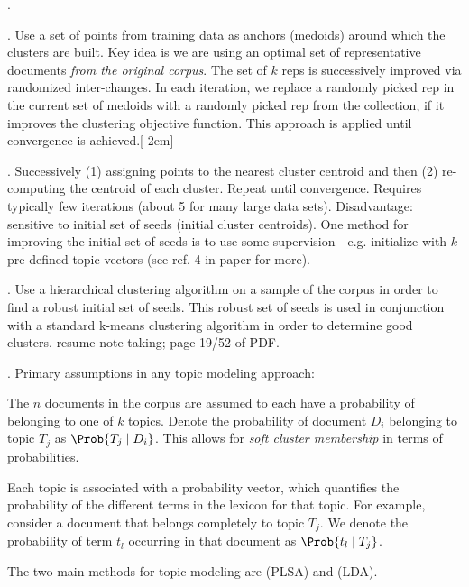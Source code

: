\documentclass[11pt]{article}
\begin{document}
\myspace
\p {}. 
\begin{compactitem}
	\item {}. Use a set of points from training data as anchors (medoids) around which the clusters are built. Key idea is we are using an optimal set of representative documents \textit{from the original corpus}. The set of $k$ reps is successively improved via randomized inter-changes. In each iteration, we replace a randomly picked rep in the current set of medoids with a randomly picked rep from the collection, if it improves the clustering objective function. This approach is applied until convergence is achieved.[-2em]
	
	\item {}. Successively (1) assigning points to the nearest cluster centroid and then (2) re-computing the centroid of each cluster. Repeat until convergence. Requires typically few iterations (about 5 for many large data sets). Disadvantage: sensitive to initial set of seeds (initial cluster centroids). One method for improving the initial set of seeds is to use some supervision - e.g. initialize with $k$ pre-defined topic vectors (see ref. 4 in paper for more). 
\end{compactitem}

\myspace
\p {}. Use a hierarchical clustering
algorithm on a sample of the corpus in order to find a robust initial set of seeds. This robust set of seeds is used in conjunction with a standard k-means clustering algorithm in order to determine good clusters. resume note-taking; page 19/52 of PDF.

\myspace
\myspace

\p {}. Primary assumptions in any topic modeling approach:
\begin{compactitem}
	\item The $n$ documents in the corpus are assumed to each have a probability of belonging to one of $k$ topics. Denote the probability of document $D_i$ belonging to topic $T_j$ as $\Prob{T_j \mid D_i}$. This allows for \textit{soft cluster membership} in terms of probabilities.
	
	\item Each topic is associated with a probability vector, which quantifies the probability of the different terms in the lexicon for that topic. For example, consider a document that belongs completely to topic $T_j$. We denote the probability of term $t_l$ occurring in that document as $\Prob{t_l \mid T_j}$. 
\end{compactitem}
The two main methods for topic modeling are  (PLSA) and  (LDA).
\end{document}
